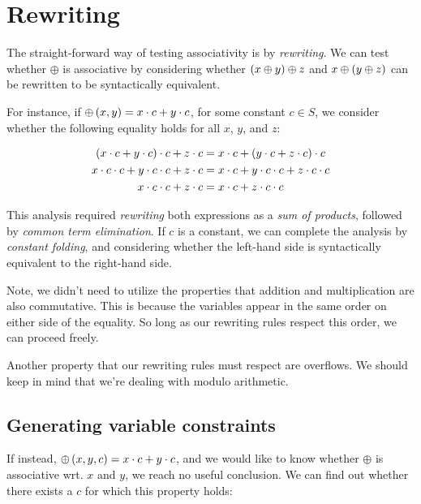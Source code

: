 
\section{Rewriting}

The straight-forward way of testing associativity is by \emph{rewriting}. We
can test whether $\oplus$ is associative by considering whether $\left({x \oplus y}\right)
\oplus z$ and $x \oplus \left({y \oplus z}\right)$ can be rewritten to be syntactically
equivalent.

For instance, if $\oplus\left({x,y}\right) = x\cdot c + y \cdot c$, for some constant
$c\in S$, we consider whether the following equality holds for all $x$, $y$,
and $z$:

\begin{align*}
\left({x\cdot c + y\cdot c}\right)\cdot c + z\cdot c &= x\cdot c + \left({y\cdot c + z\cdot c}\right)\cdot c \\
x\cdot c \cdot c + y\cdot c \cdot c + z\cdot c &= x\cdot c + y\cdot c \cdot c + z\cdot c \cdot c \\
x\cdot c \cdot c + z\cdot c &= x\cdot c + z\cdot c \cdot c
\end{align*}

This analysis required \emph{rewriting} both expressions as a \emph{sum of
products}, followed by \emph{common term elimination}. If $c$ is a constant, we
can complete the analysis by \emph{constant folding}, and considering whether
the left-hand side is syntactically equivalent to the right-hand side.

Note, we didn't need to utilize the properties that addition and multiplication
are also commutative.  This is because the variables appear in the same order
on either side of the equality. So long as our rewriting rules respect this
order, we can proceed freely. 

Another property that our rewriting rules must respect are overflows. We should
keep in mind that we're dealing with modulo arithmetic.

\subsection{Generating variable constraints}

If instead, $\oplus\left({x,y,c}\right) = x\cdot c + y \cdot c$, and we would like to know
whether $\oplus$ is associative wrt. $x$ and $y$, we reach no useful
conclusion. We can find out whether there exists a $c$ for which this property
holds:


